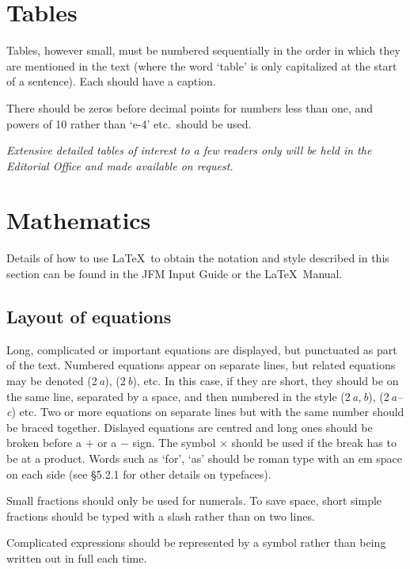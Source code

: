 \documentclass{jfm}
\begin{document}
\section{Tables}

Tables, however small, must be numbered sequentially in the order in which
they are mentioned in the text (where the word `table' is only capitalized at
the start of a sentence). Each should have a caption.

There should be zeros before decimal points for numbers less than one, and
powers of 10 rather than `e-4' etc.\ should be used.

\emph{Extensive detailed tables of interest to a few readers only
will be held in the Editorial Office and made available on request.}

\section{Mathematics}

Details of how to use \LaTeX\ to obtain the notation and style described in
this section can be found in the JFM Input Guide or the \LaTeX\ Manual.

\subsection{Layout of equations}

Long, complicated or important equations are displayed, but
punctuated as part of the text. Numbered equations appear on separate lines,
but related equations may be denoted (2\,\textit{a}), (2\,\textit{b}), etc. In
this case, if they are short, they should be on the same line, separated by a
space, and then numbered in the style (2\,\textit{a,\,b}), (2\,\textit{a--c})
etc. Two or more equations on separate lines but with the same number should
be braced together. Dislayed equations are centred and long ones should be
broken before a $+$ or a $-$ sign. The symbol $\times $ should be used if the
break has to be at a product. Words such as `for', `as' should be roman type
with an em space on each side (see \S 5.2.1 for other details on typefaces).

Small fractions should only be used for numerals. To save space, short simple
fractions should be typed with a slash rather than on two lines.

Complicated expressions should be represented by a symbol rather than being
written out in full each time.

\vspace{3 mm}
\end{document}
